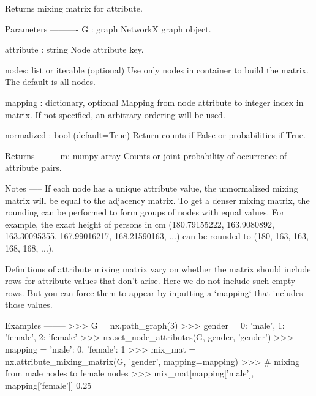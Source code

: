 \begin{DoxyVerb}Returns mixing matrix for attribute.

Parameters
----------
G : graph
   NetworkX graph object.

attribute : string
   Node attribute key.

nodes: list or iterable (optional)
    Use only nodes in container to build the matrix. The default is
    all nodes.

mapping : dictionary, optional
   Mapping from node attribute to integer index in matrix.
   If not specified, an arbitrary ordering will be used.

normalized : bool (default=True)
   Return counts if False or probabilities if True.

Returns
-------
m: numpy array
   Counts or joint probability of occurrence of attribute pairs.

Notes
-----
If each node has a unique attribute value, the unnormalized mixing matrix
will be equal to the adjacency matrix. To get a denser mixing matrix,
the rounding can be performed to form groups of nodes with equal values.
For example, the exact height of persons in cm (180.79155222, 163.9080892,
163.30095355, 167.99016217, 168.21590163, ...) can be rounded to (180, 163,
163, 168, 168, ...).

Definitions of attribute mixing matrix vary on whether the matrix
should include rows for attribute values that don't arise. Here we
do not include such empty-rows. But you can force them to appear
by inputting a `mapping` that includes those values.

Examples
--------
>>> G = nx.path_graph(3)
>>> gender = {0: 'male', 1: 'female', 2: 'female'}
>>> nx.set_node_attributes(G, gender, 'gender')
>>> mapping = {'male': 0, 'female': 1}
>>> mix_mat = nx.attribute_mixing_matrix(G, 'gender', mapping=mapping)
>>> # mixing from male nodes to female nodes
>>> mix_mat[mapping['male'], mapping['female']]
0.25
\end{DoxyVerb}
 \mbox{\label{namespacenetworkx_1_1algorithms_1_1assortativity_1_1mixing_a545380b81939bb93118f41649dbad940}} 
